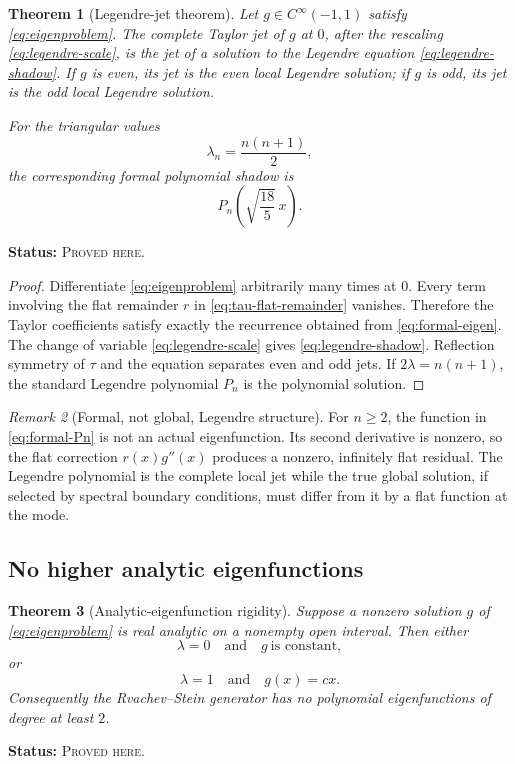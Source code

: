 \documentclass[11pt,oneside]{article}
\newtheorem{theorem}{Theorem}[section]
\theoremstyle{definition}
\theoremstyle{remark}
\newtheorem{remark}[theorem]{Remark}
\newcommand{\ProvedHere}{\textcolor{statusgreen}{\textsc{Proved here}}}
\newcommand{\Status}[1]{\par\smallskip\noindent\textbf{Status:} #1.\par\smallskip}
\begin{document}
\begin{theorem}[Legendre-jet theorem]\label{thm:legendre-jet}
Let $g\in C^\infty(-1,1)$ satisfy \eqref{eq:eigenproblem}.  The complete Taylor
jet of $g$ at $0$, after the rescaling \eqref{eq:legendre-scale}, is the jet of a
solution to the Legendre equation \eqref{eq:legendre-shadow}.  If $g$ is even,
its jet is the even local Legendre solution; if $g$ is odd, its jet is the odd
local Legendre solution.

For the triangular values
\begin{equation}\label{eq:triangular-lambda}
 \lambda_n=\frac{n(n+1)}2,
\end{equation}
the corresponding formal polynomial shadow is
\begin{equation}\label{eq:formal-Pn}
 P_n\!\left(\sqrt{\frac{18}{5}}\,x\right).
\end{equation}
\end{theorem}
\Status{\ProvedHere}

\begin{proof}
Differentiate \eqref{eq:eigenproblem} arbitrarily many times at $0$.  Every term
involving the flat remainder $r$ in \eqref{eq:tau-flat-remainder} vanishes.
Therefore the Taylor coefficients satisfy exactly the recurrence obtained from
\eqref{eq:formal-eigen}.  The change of variable \eqref{eq:legendre-scale} gives
\eqref{eq:legendre-shadow}.  Reflection symmetry of $\tau$ and the equation
separates even and odd jets.  If $2\lambda=n(n+1)$, the standard Legendre
polynomial $P_n$ is the polynomial solution.
\end{proof}

\begin{remark}[Formal, not global, Legendre structure]
For $n\ge2$, the function in \eqref{eq:formal-Pn} is not an actual eigenfunction.
Its second derivative is nonzero, so the flat correction $r(x)g''(x)$ produces a
nonzero, infinitely flat residual.  The Legendre polynomial is the complete local
jet while the true global solution, if selected by spectral boundary conditions,
must differ from it by a flat function at the mode.
\end{remark}

\subsection{No higher analytic eigenfunctions}
\begin{theorem}[Analytic-eigenfunction rigidity]\label{thm:analytic-eigen}
Suppose a nonzero solution $g$ of \eqref{eq:eigenproblem} is real analytic on a
nonempty open interval.  Then either
\[
 \lambda=0\quad\text{and}\quad g\ \text{is constant},
\]
or
\[
 \lambda=1\quad\text{and}\quad g(x)=cx.
\]
Consequently the Rvachev--Stein generator has no polynomial eigenfunctions of
degree at least $2$.
\end{theorem}
\Status{\ProvedHere}
\end{document}
